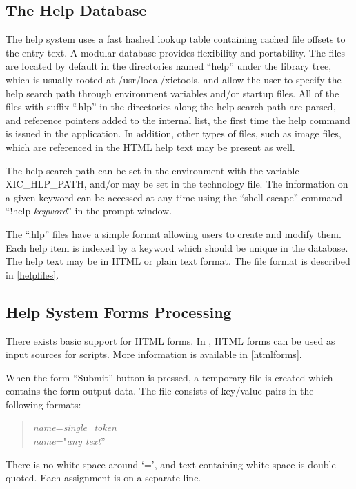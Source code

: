 \subsection{The Help Database}

The help system uses a fast hashed lookup table containing cached file
offsets to the entry text.  A modular database provides flexibility
and portability.  The files are located by default in the directories
named ``{\vt help}'' under the library tree, which is usually rooted
at {\vt /usr/local/xictools}.  {\Xic} and {\WRspice} allow the
user to specify the help search path through environment variables
and/or startup files.  All of the files with suffix ``{\vt .hlp}'' in
the directories along the help search path are parsed, and reference
pointers added to the internal list, the first time the help command
is issued in the application.  In addition, other types of files, such
as image files, which are referenced in the HTML help text may be
present as well.

The help search path can be set in the environment with the variable
{\et XIC\_HLP\_PATH}, and/or may be set in the technology file.  The
information on a given keyword can be accessed at any time using the
``shell escape'' command ``{\cb !help} {\it keyword}'' in the prompt
window.

The ``{\vt .hlp}'' files have a simple format allowing users to create
and modify them.  Each help item is indexed by a keyword which should
be unique in the database.  The help text may be in HTML or plain text
format.  The file format is described in \ref{helpfiles}.

\subsection{Help System Forms Processing}

There exists basic support for HTML forms.  In {\Xic}, HTML
forms can be used as input sources for scripts.  More information
is available in \ref{htmlforms}.

When the form ``Submit'' button is pressed, a temporary file is
created which contains the form output data.  The file consists of
key/value pairs in the following formats:
\begin{quote}
{\it name\/}={\it single\_token}\\
{\it name\/}="{\it any text\/}''
\end{quote}
There is no white space around `=', and text containing white space is
double-quoted.  Each assignment is on a separate line.

